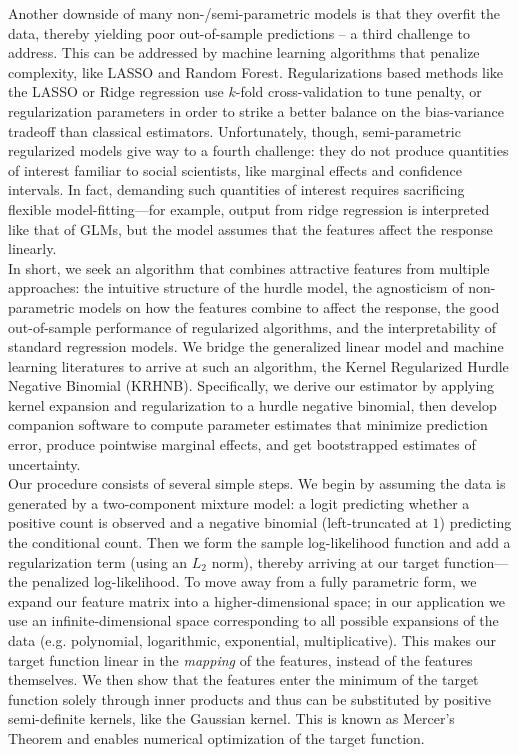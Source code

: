 \documentclass[12pt]{article}
\begin{document}
Another downside of many non-/semi-parametric models is that they overfit the data, thereby yielding poor out-of-sample predictions -- a third challenge to address. This can be addressed by machine learning algorithms that penalize complexity, like LASSO and Random Forest. Regularizations based methods like the LASSO or Ridge regression use $k$-fold cross-validation to tune penalty, or regularization parameters in order to strike a better balance on the bias-variance tradeoff than classical estimators. Unfortunately, though, semi-parametric regularized models give way to a fourth challenge: they do not produce quantities of interest familiar to social scientists, like marginal effects and confidence intervals. In fact, demanding such quantities of interest requires sacrificing flexible model-fitting---for example, output from ridge regression is interpreted like that of GLMs, but the model assumes that the features affect the response linearly.  \\

In short, we seek an algorithm that combines attractive features from multiple approaches: the intuitive structure of the hurdle model, the agnosticism of non-parametric models on how the features combine to affect the response, the good out-of-sample performance of regularized algorithms, and the interpretability of standard regression models. We bridge the generalized linear model and machine learning literatures to arrive at such an algorithm, the Kernel Regularized Hurdle Negative Binomial (KRHNB). Specifically, we derive our estimator by applying kernel expansion and regularization to a hurdle negative binomial, then develop companion software to compute parameter estimates that minimize prediction error, produce pointwise marginal effects, and get bootstrapped estimates of uncertainty. \\

Our procedure consists of several simple steps. We begin by assuming the data is generated by a two-component mixture model: a logit predicting whether a positive count is observed and a negative binomial (left-truncated at $1$) predicting the conditional count. Then we form the sample log-likelihood function and add a regularization term (using an $L_2$ norm), thereby arriving at our target function---the penalized log-likelihood. To move away from a fully parametric form, we expand our feature matrix into a higher-dimensional space; in our application we use an infinite-dimensional space corresponding to all possible expansions of the data (e.g. polynomial, logarithmic, exponential, multiplicative). This makes our target function linear in the \textit{mapping} of the features, instead of the features themselves. We then show that the features enter the minimum of the target function solely through inner products and thus can be substituted by positive semi-definite kernels, like the Gaussian kernel. This is known as Mercer's Theorem and enables numerical optimization of the target function. \\
\end{document}
